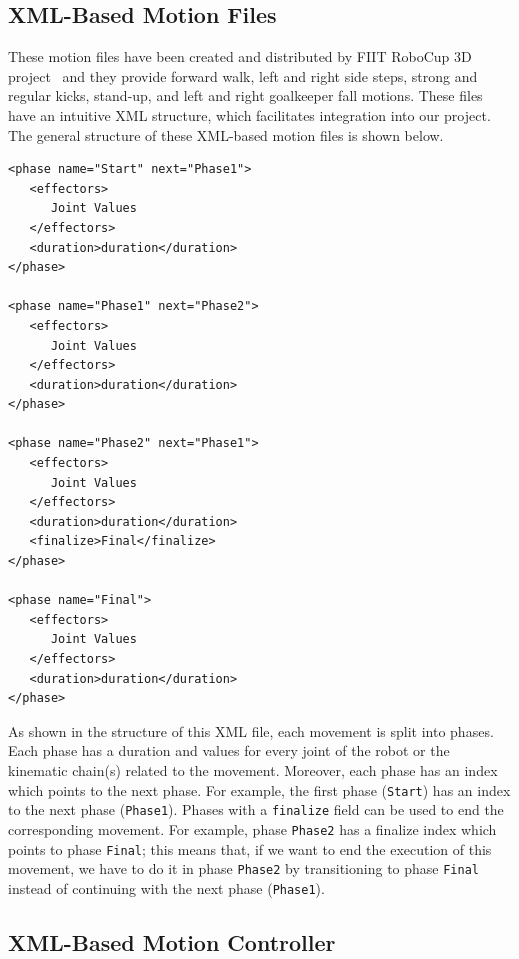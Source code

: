 \subsection{XML-Based Motion Files}
These motion files have been created and distributed by FIIT RoboCup 3D project~\cite{fiit} and they provide forward walk, left and right side steps, strong and regular kicks, stand-up, and left and right goalkeeper fall motions. These files have an intuitive XML structure, which facilitates integration into our project. The general structure of these XML-based motion files is shown below.
\begin{verbatim}
<phase name="Start" next="Phase1">
   <effectors>
      Joint Values
   </effectors>
   <duration>duration</duration>
</phase>

<phase name="Phase1" next="Phase2">
   <effectors>
      Joint Values
   </effectors>
   <duration>duration</duration>
</phase>

<phase name="Phase2" next="Phase1">
   <effectors>
      Joint Values
   </effectors>
   <duration>duration</duration>
   <finalize>Final</finalize>
</phase>

<phase name="Final">
   <effectors>
      Joint Values
   </effectors>
   <duration>duration</duration>
</phase>
\end{verbatim}
As shown in the structure of this XML file, each movement is split into phases. Each phase has a duration and values for every joint of the robot or the kinematic chain(s) related to the movement. Moreover, each phase has an index which points to the next phase. For example, the first phase (\texttt{Start}) has an index to the next phase (\texttt{Phase1}). Phases with a \texttt{finalize} field can be used to end the corresponding movement. For example, phase \texttt{Phase2} has a finalize index which points to phase \texttt{Final}; this means that, if we want to end the execution of this movement, we have to do it in phase \texttt{Phase2} by transitioning to phase \texttt{Final} instead of continuing with the next phase (\texttt{Phase1}).

\subsection{XML-Based Motion Controller}


